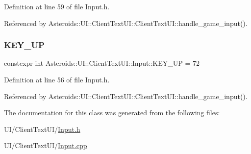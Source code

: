 Definition at line 59 of file Input.\+h.



Referenced by Asteroids\+::\+U\+I\+::\+Client\+Text\+U\+I\+::\+Client\+Text\+U\+I\+::handle\+\_\+game\+\_\+input().

\mbox{\label{classAsteroids_1_1UI_1_1ClientTextUI_1_1Input_a394d50e01f0db9d57630270d4dcc0a59}} 
\subsubsection{\texorpdfstring{K\+E\+Y\+\_\+\+UP}{KEY\_UP}}
{\footnotesize\ttfamily constexpr int Asteroids\+::\+U\+I\+::\+Client\+Text\+U\+I\+::\+Input\+::\+K\+E\+Y\+\_\+\+UP = 72\hspace{0.3cm}{\ttfamily [static]}}



Definition at line 56 of file Input.\+h.



Referenced by Asteroids\+::\+U\+I\+::\+Client\+Text\+U\+I\+::\+Client\+Text\+U\+I\+::handle\+\_\+game\+\_\+input().



The documentation for this class was generated from the following files\+:\begin{DoxyCompactItemize}
\item 
U\+I/\+Client\+Text\+U\+I/\hyperlink{Input_8h}{Input.\+h}\item 
U\+I/\+Client\+Text\+U\+I/\hyperlink{Input_8cpp}{Input.\+cpp}\end{DoxyCompactItemize}
